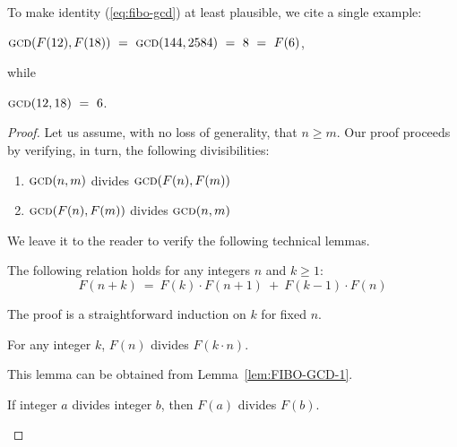 \noindent
To make identity (\ref{eq:fibo-gcd}) at least plausible, we cite a single example:

\hspace*{.35in}
$\mbox{\sc gcd}(F(12), F(18)) 
   \ = \ \mbox{\sc gcd}(144,2584)
   \ = \ 8 \ = \ F(6)$,

\noindent while

\hspace*{.35in}
$\mbox{\sc gcd}(12,18) \ = \ 6$.

\medskip

\begin{proof}
Let us assume, with no loss of generality,  that $n \geq m$.  Our proof proceeds by verifying, in turn, the following divisibilities:
\begin{enumerate}
\item
$\mbox{\sc gcd}(n,m)$ divides $\mbox{\sc gcd}(F(n), F(m))$

\item
$\mbox{\sc gcd}(F(n), F(m))$ divides $\mbox{\sc gcd}(n,m)$
\end{enumerate}

\smallskip

\noindent
We leave it to the reader to verify the following technical lemmas.


\begin{lemma}
\label{lem:FIBO-GCD-1}
The following relation holds for any integers $n$ and $k \geq 1$:
\[  F(n+k) \ = \ F(k) \cdot F(n+1) \ + \ F(k-1) \cdot F(n) \] 
\end{lemma}

\noindent
The proof is a straightforward induction on $k$ for fixed $n$.


\begin{lemma}
\label{lem:FIBO-GCD-2}
For any integer $k$, $F(n)$ divides $F(k \cdot n)$.
\end{lemma}

\noindent
This lemma can be obtained from Lemma~\ref{lem:FIBO-GCD-1}.

\begin{lemma}
\label{lem:FIBO-GCD-3}
If integer $a$ divides integer $b$, then $F(a)$ divides $F(b)$.
\end{lemma}


\end{proof}
